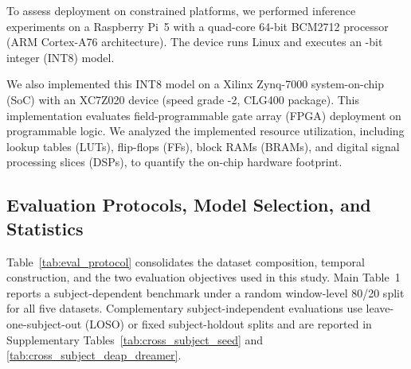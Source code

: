 \documentclass[12pt]{article}
\providecommand{\DIFaddtex}[1]{{\protect\color{blue}\sf #1}}
\providecommand{\DIFadd}[1]{\texorpdfstring{\DIFaddtex{#1}}{#1}}
\providecommand{\DIFaddbegin}{}
\providecommand{\DIFaddend}{}
\begin{document}
\DIFaddend To assess deployment on  \DIFaddbegin \DIFadd{constrained }\DIFaddend platforms, we performed inference experiments on a Raspberry Pi~5  \DIFaddbegin \DIFadd{with }\DIFaddend a quad-core 64-bit BCM2712 processor (ARM Cortex-A76 architecture). The device runs Linux and executes an  \DIFaddbegin \DIFadd{8-bit integer (INT8) }\DIFaddend model.

We also implemented this  \DIFaddbegin \DIFadd{INT8 }\DIFaddend model on a Xilinx Zynq-7000  \DIFaddbegin \DIFadd{system-on-chip (SoC) }\DIFaddend with an XC7Z020 device (speed grade -2, CLG400 package)\DIFaddbegin \DIFadd{. This implementation evaluates field-programmable gate array (FPGA) }\DIFaddend deployment on programmable logic.  \DIFaddbegin \DIFadd{We analyzed the implemented }\DIFaddend resource utilization, including lookup tables (LUTs), flip-flops (FFs), block  \DIFaddbegin \DIFadd{RAMs (BRAMs}\DIFaddend ), and digital signal processing slices (DSPs),  to quantify the on-chip hardware footprint.

\subsection{ \DIFaddbegin \DIFadd{Evaluation Protocols, }\DIFaddend Model \DIFaddbegin \DIFadd{Selection, and Statistics}\DIFaddend }\DIFaddbegin \label{supp:evaluation_protocols}
\DIFaddend 

 \DIFaddbegin \DIFadd{Table~\ref{tab:eval_protocol} consolidates the dataset composition, temporal construction, and the two evaluation objectives used in this study. Main Table~1 reports a subject-dependent benchmark under a random window-level 80/20 split for all five datasets. Complementary subject-independent evaluations use leave-one-subject-out (LOSO) or fixed subject-holdout splits and are reported in Supplementary Tables~\ref{tab:cross_subject_seed} and \ref{tab:cross_subject_deap_dreamer}.
}
\end{document}
